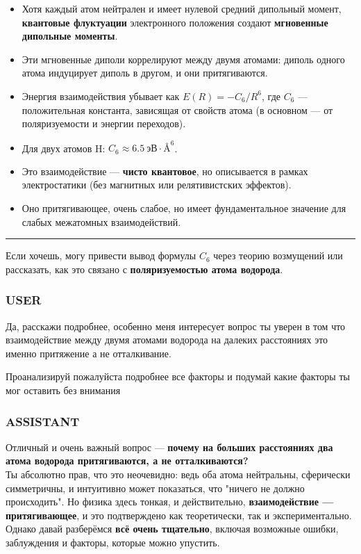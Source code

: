 \documentclass[11pt]{article}
\providecommand{\tightlist}{%
      \setlength{\itemsep}{0pt}\setlength{\parskip}{0pt}}
\begin{document}
\begin{itemize}
\tightlist
\item
  Хотя каждый атом нейтрален и имеет нулевой средний дипольный момент,
  \textbf{квантовые флуктуации} электронного положения создают
  \textbf{мгновенные дипольные моменты}.
\item
  Эти мгновенные диполи коррелируют между двумя атомами: диполь одного
  атома индуцирует диполь в другом, и они притягиваются.
\item
  Энергия взаимодействия убывает как \(E(R) = -C_6 / R^6\), где \(C_6\)
  --- положительная константа, зависящая от свойств атома (в основном
  --- от поляризуемости и энергии переходов).
\item
  Для двух атомов H: \(C_6 \approx 6.5~\text{эВ} \cdot \text{Å}^6\).
\item
  Это взаимодействие --- \textbf{чисто квантовое}, но описывается в
  рамках электростатики (без магнитных или релятивистских эффектов).
\item
  Оно притягивающее, очень слабое, но имеет фундаментальное значение для
  слабых межатомных взаимодействий.
\end{itemize}

\begin{center}\rule{0.5\linewidth}{\linethickness}\end{center}

Если хочешь, могу привести вывод формулы \(C_6\) через теорию возмущений
или рассказать, как это связано с \textbf{поляризуемостью атома
водорода}.

\subsubsection{USER}\label{user-1}

Да, расскажи подробнее, особенно меня интересует вопрос ты уверен в том
что взаимодействие между двумя атомами водорода на далеких расстояниях
это именно притяжение а не отталкивание.

Проанализируй пожалуйста подробнее все факторы и подумай какие факторы
ты мог оставить без внимания

\subsubsection{ASSISTANT}\label{assistant-1}

Отличный и очень важный вопрос --- \textbf{почему на больших расстояниях
два атома водорода притягиваются, а не отталкиваются?}\\
Ты абсолютно прав, что это неочевидно: ведь оба атома нейтральны,
сферически симметричны, и интуитивно может показаться, что "ничего не
должно происходить". Но физика здесь тонкая, и действительно,
\textbf{взаимодействие --- притягивающее}, и это подтверждено как
теоретически, так и экспериментально. Однако давай разберёмся
\textbf{всё очень тщательно}, включая возможные ошибки, заблуждения и
факторы, которые можно упустить.
\end{document}
